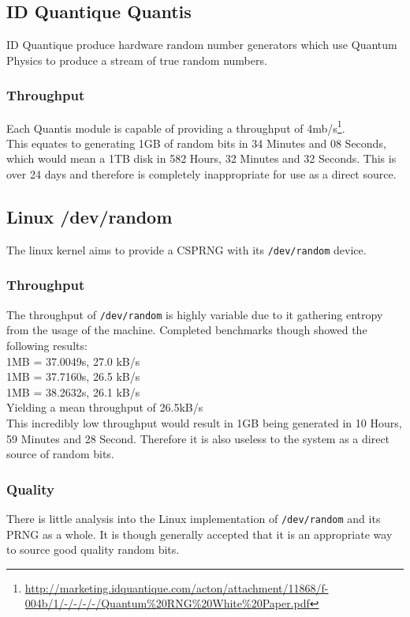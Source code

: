 \documentclass{paper}
\begin{document}
		\subsection{ID Quantique Quantis}
		ID Quantique produce hardware random number generators which use Quantum Physics to produce a stream of true random numbers.
			\subsubsection{Throughput}
				Each Quantis module is capable of providing a throughput of 4mb/s\footnote{\url{http://marketing.idquantique.com/acton/attachment/11868/f-004b/1/-/-/-/-/Quantum\%20RNG\%20White\%20Paper.pdf}}.\\
				This equates to generating 1GB of random bits in 34 Minutes and 08 Seconds, which would mean a 1TB disk in 582 Hours, 32 Minutes and 32 Seconds. This is over 24 days and therefore is completely inappropriate for use as a direct source.\\
			
		\subsection{Linux /dev/random}
		The linux kernel aims to provide a CSPRNG with its \texttt{/dev/random} device.
			\subsubsection{Throughput}
				The throughput of \texttt{/dev/random} is highly variable due to it gathering entropy from the usage of the machine. Completed benchmarks though showed the following results:\\	
				1MB = 37.0049s, 27.0 kB/s\\
				1MB = 37.7160s, 26.5 kB/s\\
				1MB = 38.2632s, 26.1 kB/s\\
				Yielding a mean throughput of 26.5kB/s\\
				
				This incredibly low throughput would result in 1GB being generated in 10 Hours, 59 Minutes and 28 Second. Therefore it is also useless to the system as a direct source of random bits.\\
			\subsubsection{Quality}
				There is little analysis into the Linux implementation of  \texttt{/dev/random} and its PRNG as a whole. It is though generally accepted that it is an appropriate way to source good quality random bits.\\
			
\end{document}
